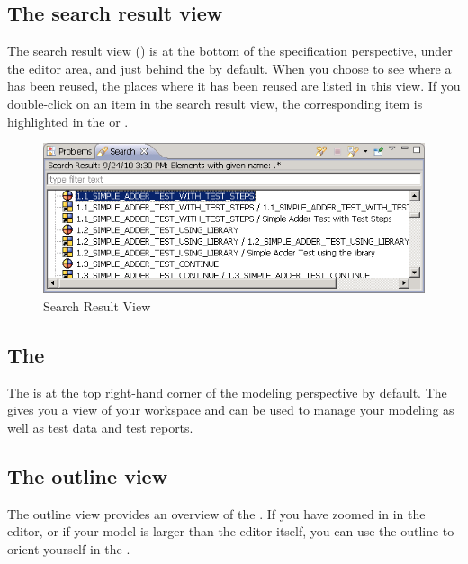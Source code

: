 \subsection{The search result view}
The search result view () is at the bottom of the specification perspective, under the editor area, and just behind the \gdprobview{} by default. When you choose to see where a \gdcase{} has been reused, the places where it has been reused are listed in this view. If you double-click on an item in the search result view, the corresponding item is highlighted in the \gdtestcasebrowser{} or \gdtestsuitebrowser{}.  



\begin{figure}[hbtp]
\begin{center}
\includegraphics{Userinterface/Editors/PS/showresultview}
\caption{Search Result View}
\label{showresultview}
\end{center}
\end{figure}

\subsection{The \gdnavview{}}
\protect{}
The \gdnavview{} is at the top right-hand corner of the modeling perspective by default. The \gdnavview{} gives you a view of your workspace and can be used to manage your modeling \gdprojects{} as well as test data and test reports. 

\subsection{The outline view}
The outline view provides an overview of the \gdmodeleditor{}. If you have zoomed in in the editor, or if your model is larger than the editor itself, you can use the outline to orient yourself in the \gdmodeleditor{}. 

